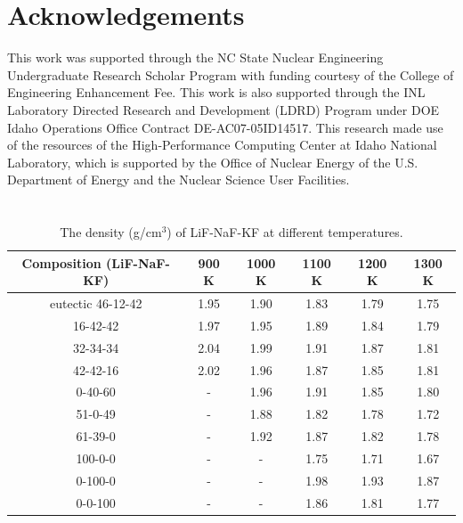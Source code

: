 \documentclass[preprint,12pt]{elsarticle}
\begin{document}


\section{Acknowledgements}
This work was supported through the NC State Nuclear Engineering Undergraduate Research Scholar Program with funding courtesy of the College of Engineering Enhancement Fee. This work is also supported through the INL Laboratory Directed Research and Development (LDRD) Program under DOE Idaho Operations Office Contract DE-AC07-05ID14517. This research made use of the resources of the High-Performance Computing Center at Idaho National Laboratory, which is supported by the Office of Nuclear Energy of the U.S. Department of Energy and the Nuclear Science User Facilities. 

\appendix
\setcounter{table}{0}
\section{}

\begin{table}[h]
\centering
\caption{The density (g/cm$^{3}$) of LiF-NaF-KF at different temperatures. }
\begin{tabular}{|c|ccccc|}
\hline
Composition (LiF-NaF-KF) & 900 K &  1000 K  & 1100 K  & 1200 K & 1300 K    \\
\hline
eutectic 46-12-42 & 1.95 & 1.90 & 1.83 & 1.79 & 1.75 \\
16-42-42 & 1.97 & 1.95 & 1.89 & 1.84 & 1.79       \\
32-34-34 & 2.04 & 1.99 & 1.91 & 1.87 & 1.81       \\
42-42-16 & 2.02 & 1.96 & 1.87 & 1.85 & 1.81       \\
0-40-60  & - & 1.96 & 1.91 & 1.85 & 1.80       \\
51-0-49  & - & 1.88 & 1.82 & 1.78 & 1.72       \\
61-39-0  & - & 1.92 & 1.87 & 1.82 & 1.78       \\
100-0-0  & - & - & 1.75 & 1.71 & 1.67       \\
0-100-0  & - & - & 1.98 & 1.93 & 1.87       \\
0-0-100  & - & - & 1.86 & 1.81 & 1.77       \\
\hline
\end{tabular}
\label{tab:append_dens}
\end{table}
\FloatBarrier
\end{document}
